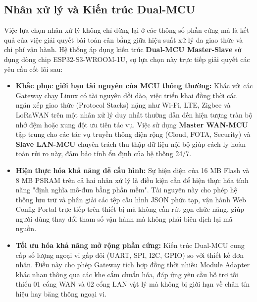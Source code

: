     \subsection{Nhân xử lý và Kiến trúc Dual-MCU}
        Việc lựa chọn nhân xử lý không chỉ dừng lại ở các thông số phần cứng mà là kết quả của việc giải quyết bài toán cân bằng giữa hiệu suất xử lý đa giao thức và chi phí vận hành. Hệ thống áp dụng kiến trúc \textbf{Dual-MCU Master-Slave} sử dụng dòng chip ESP32-S3-WROOM-1U, sự lựa chọn này trực tiếp giải quyết các yêu cầu cốt lõi sau:

        \begin{itemize}
            \item \textbf{Khắc phục giới hạn tài nguyên của MCU thông thường:} 
            Khác với các Gateway chạy Linux có tài nguyên dồi dào, việc triển khai đồng thời các ngăn xếp giao thức (Protocol Stacks) nặng như Wi-Fi, LTE, Zigbee và LoRaWAN trên một nhân xử lý duy nhất thường dẫn đến hiện tượng tràn bộ nhớ đệm hoặc xung đột ưu tiên tác vụ. 
            Việc sử dụng \textbf{Master WAN-MCU} tập trung cho các tác vụ truyền thông diện rộng (Cloud, FOTA, Security) và \textbf{Slave LAN-MCU} chuyên trách thu thập dữ liệu nội bộ giúp cách ly hoàn toàn rủi ro này, đảm bảo tính ổn định của hệ thống 24/7.

            \item \textbf{Hiện thực hóa khả năng dễ cấu hình:} 
            Sự hiện diện của 16 MB Flash và 8 MB PSRAM trên cả hai nhân xử lý là điều kiện cần để hiện thực hóa tính năng "định nghĩa mô-đun bằng phần mềm". Tài nguyên này cho phép hệ thống lưu trữ và phân giải các tệp cấu hình JSON phức tạp, vận hành Web Config Portal trực tiếp trên thiết bị mà không cần rút gọn chức năng, giúp người dùng thay đổi tham số vận hành mà không phải biên dịch lại mã nguồn.

            \item \textbf{Tối ưu hóa khả năng mở rộng phần cứng:} 
            Kiến trúc Dual-MCU cung cấp số lượng ngoại vi gấp đôi (UART, SPI, I2C, GPIO) so với thiết kế đơn nhân. Điều này cho phép Gateway tích hợp đồng thời nhiều Module Adapter khác nhau thông qua các khe cắm chuẩn hóa, đáp ứng yêu cầu hỗ trợ tối thiểu 01 cổng WAN và 02 cổng LAN vật lý mà không bị giới hạn về chân tín hiệu hay băng thông ngoại vi.


\end{itemize}
